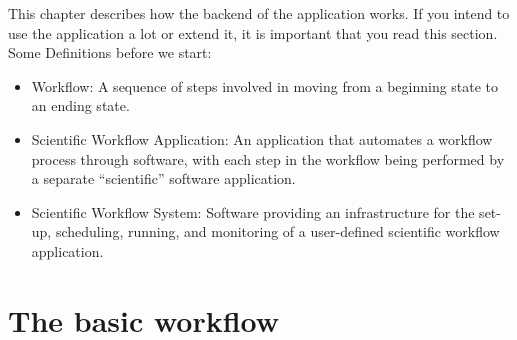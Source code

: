 This chapter describes how the backend of the \texttt{\getsoftwarename{}} application works. If you intend to use the application a lot or extend it, it is important that you read this section.\\

Some Definitions before we start:
\begin{itemize}
    \item Workflow: A sequence of steps involved in moving from a beginning state to an ending state.
    \item Scientific Workflow Application: An application that automates a workflow process through software, with each step in the workflow being performed by a separate “scientific” software application.
    \item Scientific Workflow System: Software providing an infrastructure for the set-up, scheduling, running, and monitoring of a user-defined scientific workflow application. 
\end{itemize}

\section{The basic workflow}


